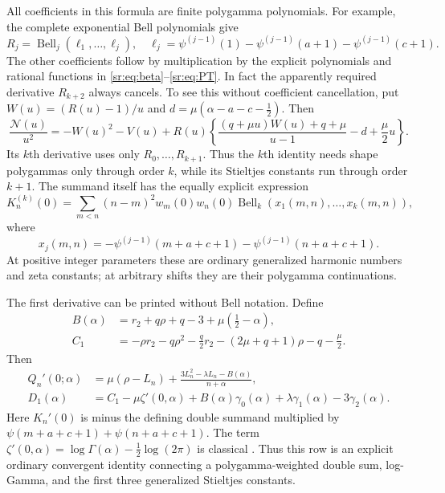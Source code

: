 All coefficients in this formula are finite polygamma polynomials.
For example, the complete exponential Bell polynomials give
\[
 R_j=\operatorname{Bell}_j(\ell_1,\ldots,\ell_j),\quad
 \ell_j=\psi^{(j-1)}(1)-\psi^{(j-1)}(a+1)-\psi^{(j-1)}(c+1).
\]
The other coefficients follow by multiplication by the explicit
polynomials and rational functions in \eqref{sr:eq:beta}--\eqref{sr:eq:PT}.
In fact the apparently required derivative $R_{k+2}$ always cancels.
To see this without coefficient cancellation, put
$W(u)=(R(u)-1)/u$ and $d=\mu(\alpha-a-c-\tfrac12)$. Then
\begin{equation}\label{sr:eq:lower-order-G}
 \frac{\mathcal N(u)}{u^2}=-W(u)^2-V(u)
 +R(u)\left\{\frac{(q+\mu u)W(u)+q+\mu}{u-1}
                    -d+\frac\mu2u\right\}.
\end{equation}
Its $k$th derivative uses only $R_0,\ldots,R_{k+1}$.
Thus the $k$th identity needs shape polygammas only through order $k$,
while its Stieltjes constants run through order $k+1$.
The summand itself has the equally explicit expression
\begin{equation}\label{sr:eq:K-bell}
 K_n^{(k)}(0)=\sum_{m<n}(n-m)^2w_m(0)w_n(0)
 \operatorname{Bell}_k(x_1(m,n),\ldots,x_k(m,n)),
\end{equation}
where
\[
 x_j(m,n)=-\psi^{(j-1)}(m+a+c+1)-\psi^{(j-1)}(n+a+c+1).
\]
At positive integer parameters these are ordinary generalized harmonic
numbers and zeta constants; at arbitrary shifts they are their
polygamma continuations.

The first derivative can be printed without Bell notation. Define
\begin{align}
 B(\alpha)&=r_2+q\rho+q-3+\mu(\tfrac12-\alpha),\label{sr:eq:B}\\
 C_1&=-\rho r_2-q\rho^2-\frac q2r_2
 -(2\mu+q+1)\rho-q-\frac\mu2.
 \label{sr:eq:C1}
\end{align}
Then
\begin{align}
 Q_n'(0;\alpha)&=\mu(\rho-L_n)
 +\frac{3L_n^2-\lambda L_n-B(\alpha)}{n+\alpha},
 \label{sr:eq:Q1}\\
 D_1(\alpha)&=C_1-\mu\zeta'(0,\alpha)
 +B(\alpha)\gamma_0(\alpha)+\lambda\gamma_1(\alpha)
 -3\gamma_2(\alpha).
 \label{sr:eq:D1}
\end{align}
Here $K_n'(0)$ is minus the defining double summand multiplied by
$\psi(m+a+c+1)+\psi(n+a+c+1)$. The term
$\zeta'(0,\alpha)=\log\Gamma(\alpha)-\tfrac12\log(2\pi)$
is classical \cite[25.11.18]{dlmf-hurwitz}. Thus this row is an explicit
ordinary convergent identity connecting a polygamma-weighted double
sum, log-Gamma, and the first three generalized Stieltjes constants.

